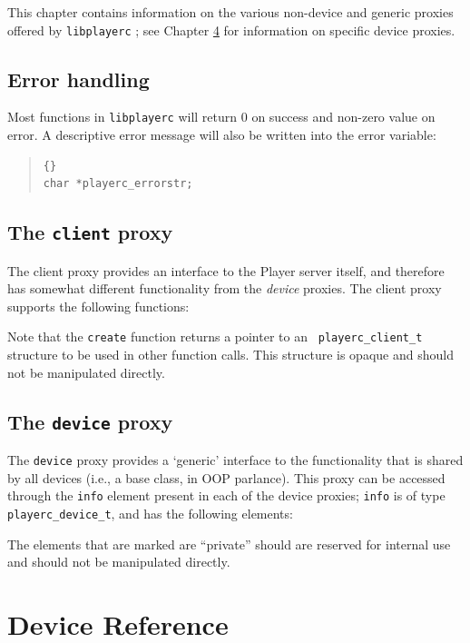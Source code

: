 \documentclass[11pt]{report}
\def\libplayerc {{\tt libplayerc} }
\begin{document}
This chapter contains information on the various non-device and
generic proxies offered by \libplayerc; see Chapter \ref{chap.devices}
for information on specific device proxies.


\section{Error handling}

Most functions in \libplayerc will return 0 on success and non-zero
value on error.  A descriptive error message will also be written into
the error variable:
\begin{quote}
\begin{lstlisting}{}
char *playerc_errorstr;
\end{lstlisting}
\end{quote}


\section{The {\tt client} proxy}

The client proxy provides an interface to the Player server itself,
and therefore has somewhat different functionality from the {\em
device} proxies.  The client proxy supports the following functions:
\begin{quote}

\end{quote}
Note that the {\tt create} function returns a pointer to an {\tt
playerc\_client\_t} structure to be used in other function calls.
This structure is opaque and should not be manipulated directly.


\section{The {\tt device} proxy}

The {\tt device} proxy provides a `generic' interface to the
functionality that is shared by all devices (i.e., a base class, in
OOP parlance).  This proxy can be accessed through the {\tt info}
element present in each of the device proxies; {\tt info} is of type
{\tt playerc\_device\_t}, and has the following elements:
\begin{quote}

\end{quote}
The elements that are marked are ``private'' should are reserved for 
internal use and should not be manipulated directly.


\chapter{Device Reference}
\label{chap.devices}
\end{document}
